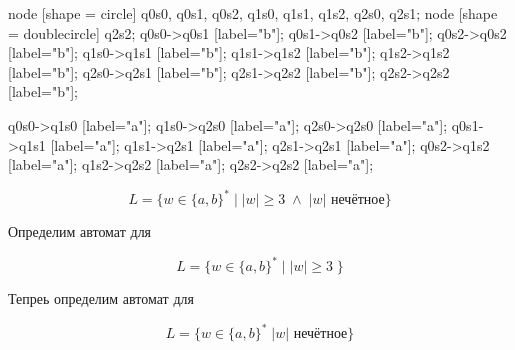 \documentclass[fleqn]{article}
\begin{document}
 {
    node [shape = circle] q0s0, q0s1, q0s2, q1s0, q1s1, q1s2, q2s0, q2s1;
    node [shape = doublecircle] q2s2;
    q0s0->q0s1 [label="b"];
    q0s1->q0s2 [label="b"];
    q0s2->q0s2 [label="b"];
    q1s0->q1s1 [label="b"];
    q1s1->q1s2 [label="b"];
    q1s2->q1s2 [label="b"];
    q2s0->q2s1 [label="b"];
    q2s1->q2s2 [label="b"];
    q2s2->q2s2 [label="b"];
    
    q0s0->q1s0 [label="a"];
    q1s0->q2s0 [label="a"];
    q2s0->q2s0 [label="a"];
    q0s1->q1s1 [label="a"];
    q1s1->q2s1 [label="a"];
    q2s1->q2s1 [label="a"];
    q0s2->q1s2 [label="a"];
    q1s2->q2s2 [label="a"];
    q2s2->q2s2 [label="a"];
}

\begin{equation}
    L = \{w \in \{ a,b \}^* \; | \; |w| \geq 3 \; \wedge \; |w| \mbox{ нечётное} \}
\end{equation}

Определим автомат для

\begin{equation}
    L = \{w \in \{ a,b \}^* \; | \; |w| \geq 3 \; \}
\end{equation}


Тепреь определим автомат для

\begin{equation}
    L = \{w \in \{ a,b \}^* \; |w| \mbox{ нечётное} \}
\end{equation}

\end{document}
